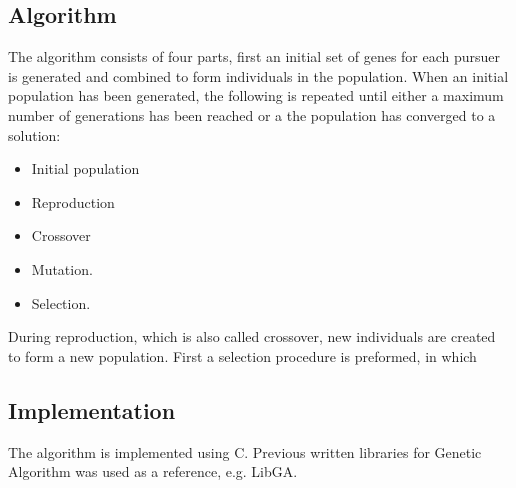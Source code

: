 \subsection{Algorithm}
The algorithm consists of four parts, first an initial set of genes for each pursuer is generated and combined to form individuals in the population. When an initial population has been generated, the following is repeated until either a maximum number of generations has been reached or a the population has converged to a solution:\\
\begin{itemize}
\item Initial population
\item Reproduction%
\item Crossover
\item Mutation.%
\item Selection. %

\end{itemize}
During reproduction, which is also called crossover, new individuals are created to form a new population. First a selection procedure is preformed, in which 

\subsection{Implementation}
The algorithm is implemented using C. Previous written libraries for Genetic Algorithm was used as a reference, e.g. LibGA.

